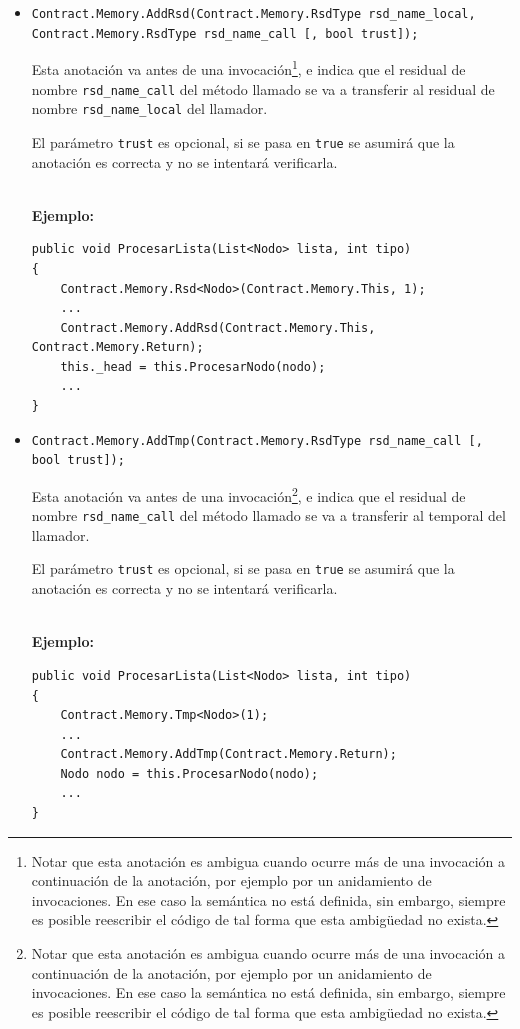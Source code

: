 \documentclass[12pt,a4paper]{article}
\newcommand\mono[1]{\texttt{#1}}
\begin{document}
			\begin{itemize}
				\item
					\mono{Contract.Memory.AddRsd(Contract.Memory.RsdType rsd\_name\_local, \\ Contract.Memory.RsdType rsd\_name\_call [, bool trust]);}

					Esta anotación va antes de una invocación\footnote{Notar que esta anotación es ambigua cuando ocurre más de una invocación a continuación de la anotación, por ejemplo por un anidamiento de invocaciones. En ese caso la semántica no está definida, sin embargo, siempre es posible reescribir el código de tal forma que esta ambigüedad no exista.}, e indica que el residual de nombre \mono{rsd\_name\_call} del método llamado se va a transferir al residual de nombre \mono{rsd\_name\_local} del llamador.

					El parámetro \mono{trust} es opcional, si se pasa en \mono{true} se asumirá que la anotación es correcta y no se intentará verificarla.

					\noindent\\
					\textbf{Ejemplo:}
					\begin{footnotesize}
					\begin{lstlisting}[caption=Ejemplo de \mono{Contract.Memory.AddRsd},numbers=none]
public void ProcesarLista(List<Nodo> lista, int tipo)
{
	Contract.Memory.Rsd<Nodo>(Contract.Memory.This, 1);
	...
	Contract.Memory.AddRsd(Contract.Memory.This, Contract.Memory.Return);
	this._head = this.ProcesarNodo(nodo);
	...
}
					\end{lstlisting}
					\end{footnotesize}
				\item
					\mono{Contract.Memory.AddTmp(Contract.Memory.RsdType rsd\_name\_call [, bool trust]);}

					Esta anotación va antes de una invocación\footnote{Notar que esta anotación es ambigua cuando ocurre más de una invocación a continuación de la anotación, por ejemplo por un anidamiento de invocaciones. En ese caso la semántica no está definida, sin embargo, siempre es posible reescribir el código de tal forma que esta ambigüedad no exista.}, e indica que el residual de nombre \mono{rsd\_name\_call} del método llamado se va a transferir al temporal del llamador.

					El parámetro \mono{trust} es opcional, si se pasa en \mono{true} se asumirá que la anotación es correcta y no se intentará verificarla.

					\noindent\\
					\textbf{Ejemplo:}
					\begin{footnotesize}
					\begin{lstlisting}[caption=Ejemplo de \mono{Contract.Memory.AddTmp},numbers=none]
public void ProcesarLista(List<Nodo> lista, int tipo)
{
	Contract.Memory.Tmp<Nodo>(1);
	...
	Contract.Memory.AddTmp(Contract.Memory.Return);
	Nodo nodo = this.ProcesarNodo(nodo);
	...
}
					\end{lstlisting}
					\end{footnotesize}
			\end{itemize}
\end{document}
